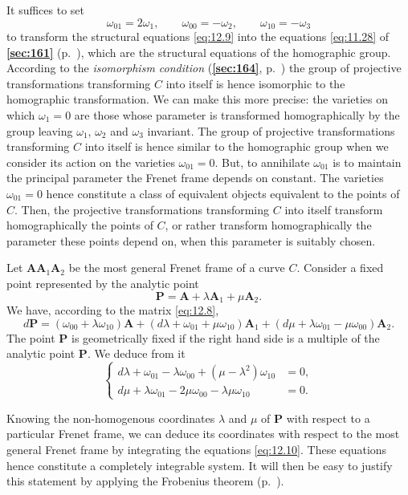 \documentclass[leqno,11pt]{book}
\numberwithin{equation}{chapter}
\theoremstyle{shape1}
\theoremstyle{shapesmall}
\newcommand{\fsref}[1]{{\rm\textsection\textbf{\ref{sec:#1}}}}
\begin{document}
It suffices to set
\[
\omega_{01}=2\omega_{1},\qquad\omega_{00}=-\omega_{2},\qquad\omega_{10}=-\omega_{3}
\]
to transform the structural equations \eqref{eq:12.9} into the equations \eqref{eq:11.28} of \fsref{161} (p.~\pageref{eq:11.28}), which are the structural equations of the homographic group. According to the \emph{isomorphism condition} (\fsref{164}, p.~\pageref{sec:164}) the group of projective transformations transforming $C$ into itself is hence isomorphic to the homographic transformation. We can make this more precise: the varieties on which $\omega_{1}=0$ are those whose parameter is transformed homographically by the group leaving $\omega_{1}$, $\omega_{2}$ and $\omega_{3}$ invariant. The group of projective transformations transforming $C$ into itself is hence similar to the homographic group when we consider its action on the varieties $\omega_{01}=0$. But, to annihilate $\omega_{01}$ is to maintain the principal parameter the Frenet frame depends on constant. The varieties $\omega_{01}=0$ hence constitute a class of equivalent objects equivalent to the points of $C$. Then, the projective transformations transforming $C$ into itself transform homographically the points of $C$, or rather transform homographically the parameter these points depend on, when this parameter is suitably chosen.

Let $\mathbf{AA}_{1}\mathbf{A}_{2}$ be the most general Frenet frame of a curve $C$. Consider a fixed point represented by the analytic point
\[
\mathbf{P}=\mathbf{A}+\lambda\mathbf{A}_{1}+\mu\mathbf{A}_{2}.
\]
We have, according to the matrix \eqref{eq:12.8},
\[
d\mathbf{P}=(\omega_{00}+\lambda\omega_{10})\mathbf{A}+(d\lambda+\omega_{01}+\mu\omega_{10})\mathbf{A}_{1}+(d\mu+\lambda\omega_{01}-\mu\omega_{00})\mathbf{A}_{2}.
\]
The point $\mathbf{P}$ is geometrically fixed if the right hand side is a multiple of the analytic point $\mathbf{P}$. We deduce from it
\begin{equation}
  \label{eq:12.10}
  \left\{
    \begin{aligned}
      d\lambda+\omega_{01}-\lambda\omega_{00}+(\mu-\lambda^{2})\omega_{10}&=0,\\
      d\mu+\lambda\omega_{01}-2\mu\omega_{00}-\lambda\mu\omega_{10}&=0.
    \end{aligned}
  \right.
\end{equation}

Knowing the non-homogenous coordinates $\lambda$ and $\mu$ of $\mathbf{P}$ with respect to a particular Frenet frame, we can deduce its coordinates with respect to the most general Frenet frame by integrating the equations \eqref{eq:12.10}. These equations hence constitute a completely integrable system. It will then be easy to justify this statement by applying the Frobenius theorem (p.~\pageref{sec:166}).
\end{document}
